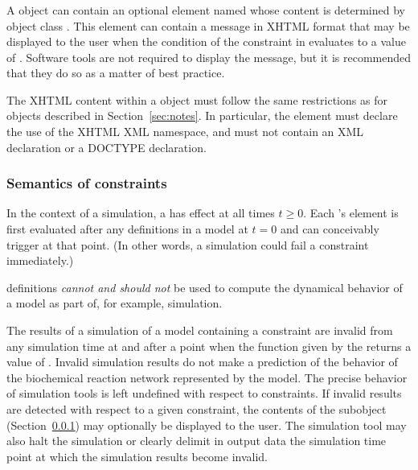 \subsubsection{}
\label{sec:constraint-message}

A \Constraint object can contain an optional element named
 whose content is determined by object class \Message.
This element can contain a message in XHTML format that may be
displayed to the user when the condition of the constraint in
 evaluates to a value of .  Software tools
are not required to display the message, but it is recommended
that they do so as a matter of best practice.

The XHTML content within a \Message object must follow the same
restrictions as for \Notes objects described in
Section~\ref{sec:notes}.  In particular, the element must declare
the use of the XHTML XML namespace, and must not contain an XML
declaration or a DOCTYPE declaration.


\subsubsection{Semantics of constraints}
\label{sec:constraint-semantics}

In the context of a simulation, a \Constraint has effect at all
times $t \geq 0$.  Each \Constraint's  element is first
evaluated after any \InitialAssignment definitions in a model at
$t = 0$ and can conceivably trigger at that point.  (In other
words, a simulation could fail a constraint immediately.)

\Constraint definitions \emph{cannot and should not} be used to
compute the dynamical behavior of a model as part of, for example,
simulation.  

The results of a simulation of a model containing a constraint are
invalid from any simulation time at and after a point when the
function given by the  returns a value of .
Invalid simulation results do not make a prediction of the
behavior of the biochemical reaction network represented by the
model.  The precise behavior of simulation tools is left undefined
with respect to constraints.  If invalid results are detected with
respect to a given constraint, the contents of the \Message
subobject (Section~\ref{sec:constraint-message}) may optionally be
displayed to the user.  The simulation tool may also halt the
simulation or clearly delimit in output data the simulation time
point at which the simulation results become invalid.

